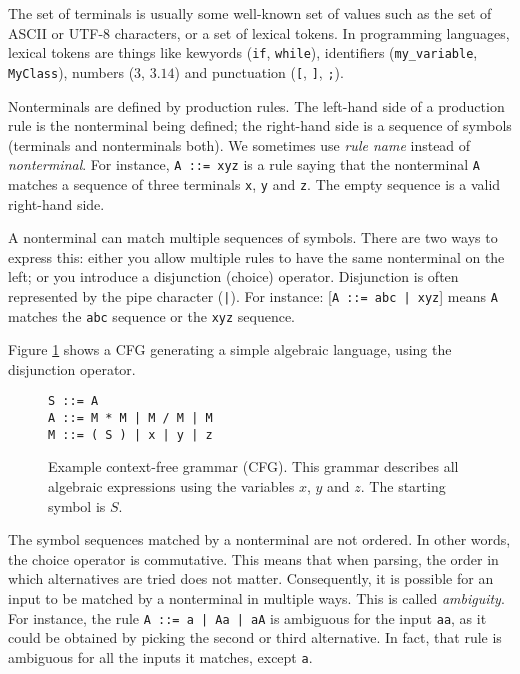 The set of terminals is usually some well-known set of values such as the set of
ASCII or UTF-8 characters, or a set of lexical tokens. In programming languages,
lexical tokens are things like kewyords (\texttt{if}, \texttt{while}),
identifiers (\texttt{my_variable}, \texttt{MyClass}), numbers ($3$, $3.14$) and
punctuation (\texttt{[}, \texttt{]}, \texttt{;}).

Nonterminals are defined by production rules. The left-hand side of a production
rule is the nonterminal being defined; the right-hand side is a sequence of
symbols (terminals and nonterminals both). We sometimes use \emph{rule name}
instead of \emph{nonterminal}. For instance, \lstinline{A ::= xyz} is a rule
saying that the nonterminal \texttt{A} matches a sequence of three terminals
\texttt{x}, \texttt{y} and \texttt{z}. The empty sequence is a valid right-hand
side.

A nonterminal can match multiple sequences of symbols. There are two ways to
express this: either you allow multiple rules to have the same nonterminal on
the left; or you introduce a disjunction (choice) operator. Disjunction is often
represented by the pipe character (\texttt{|}).
For instance: [\lstinline{A ::= abc | xyz}] means \texttt{A} matches the
\texttt{abc} sequence or the \texttt{xyz} sequence.

Figure \ref{cfg_example} shows a CFG generating a simple algebraic language,
using the disjunction operator.

\begin{figure}
\small
\begin{lstlisting}[frame=single]
S ::= A
A ::= M * M | M / M | M
M ::= ( S ) | x | y | z
\end{lstlisting}
\caption{Example context-free grammar (CFG). This grammar describes all
  algebraic expressions using the variables $x$, $y$ and $z$. The starting
  symbol is $S$.}
\label{cfg_example}
\end{figure}

The symbol sequences matched by a nonterminal are not ordered. In other words,
the choice operator is commutative. This means that when parsing, the order in
which alternatives are tried does not matter. Consequently, it is possible for
an input to be matched by a nonterminal in multiple ways. This is called
\emph{ambiguity}. For instance, the rule \lstinline{A ::= a | Aa | aA} is
ambiguous for the input \texttt{aa}, as it could be obtained by picking the
second or third alternative. In fact, that rule is ambiguous for all the inputs
it matches, except \texttt{a}.

